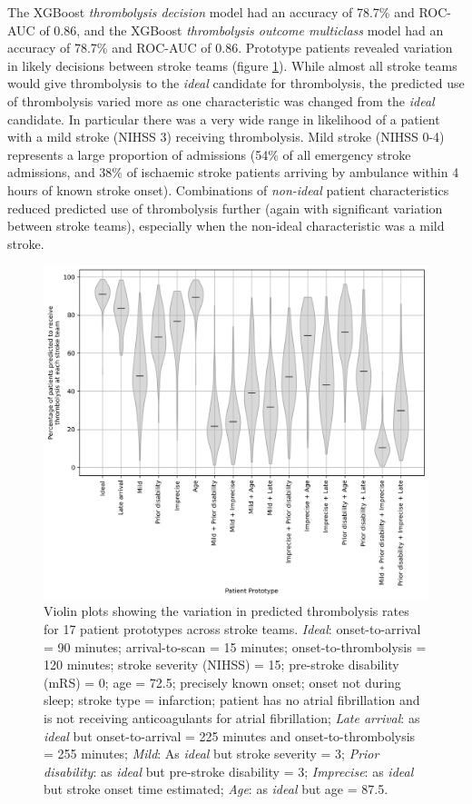 The XGBoost \textit{thrombolysis decision} model had an accuracy of 78.7\% and ROC-AUC of 0.86, and the XGBoost \textit{thrombolysis outcome multiclass} model had an accuracy of 78.7\% and ROC-AUC of 0.86. Prototype patients revealed variation in likely decisions between stroke teams (figure \ref{fig:thrombolysis_rates_prototype_patients1}). While almost all stroke teams would give thrombolysis to the \textit{ideal} candidate for thrombolysis, the predicted use of thrombolysis varied more as one characteristic was changed from the \textit{ideal} candidate. In particular there was a very wide range in likelihood of a patient with a mild stroke (NIHSS 3) receiving thrombolysis. Mild stroke (NIHSS 0-4) represents a large proportion of admissions (54\% of all emergency stroke admissions, and 38\% of ischaemic stroke patients arriving by ambulance within 4 hours of known stroke onset). Combinations of \textit{non-ideal} patient characteristics reduced predicted use of thrombolysis further (again with significant variation between stroke teams), especially when the non-ideal characteristic was a mild stroke.

\begin{figure}
    \centering
    \includegraphics[width=0.75\linewidth]{images/p5_prototype_decision.png}
    \caption{Violin plots showing the variation in predicted thrombolysis rates for 17 patient prototypes across stroke teams. \textit{Ideal}: onset-to-arrival = 90 minutes; arrival-to-scan = 15 minutes; onset-to-thrombolysis = 120 minutes; stroke severity (NIHSS) = 15; pre-stroke disability (mRS) = 0; age = 72.5; precisely known onset; onset not during sleep; stroke type = infarction; patient has no atrial fibrillation and is not receiving anticoagulants for atrial fibrillation; \textit{Late arrival}: as \textit{ideal} but onset-to-arrival = 225 minutes and onset-to-thrombolysis = 255 minutes; \textit{Mild}: As \textit{ideal} but stroke severity = 3; \textit{Prior disability}: as \textit{ideal} but pre-stroke disability = 3; \textit{Imprecise}: as \textit{ideal} but stroke onset time estimated; \textit{Age}: as \textit{ideal} but age = 87.5.}
    \label{fig:thrombolysis_rates_prototype_patients1}
\end{figure}